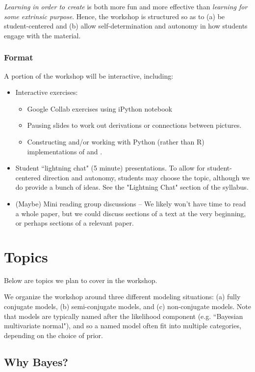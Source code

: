\documentclass{article} %
\begin{document}
\textit{Learning in order to create} is both more fun and more effective than \textit{learning for some extrinsic purpose}.   Hence,  the workshop is structured so as to (a) be student-centered and (b) allow self-determination and autonomy in how students engage with the material. 

\subsubsection{Format}

A portion of the workshop will be interactive,  including:

\begin{itemize}
\item Interactive exercises:
	\begin{itemize}
	\item Google Collab exercises using iPython notebook
	\item Pausing slides to work out derivations or connections between pictures. 
	\item Constructing and/or working with Python (rather than R) implementations of \cite{hoff2009first} and \cite{gelman2013bayesian}.
	\end{itemize}
\item Student ``lightning chat" (5 minute) presentations.   To allow for student-centered direction and autonomy,  students may choose the topic, although we do provide a bunch of ideas.  See the "Lightning Chat" section of the syllabus.	
\item (Maybe) Mini reading group discussions  -- We likely won't have time to read a whole paper,  but we could discuss sections of a text at the very beginning, or perhaps sections of a relevant paper.
\end{itemize}

\section{Topics}

Below are topics we plan to cover in the workshop.

We organize the workshop around three different modeling situations: (a) fully conjugate models, (b) semi-conjugate models, and (c) non-conjugate models. Note that models are typically named after the likelihood component (e.g. ``Bayesian multivariate normal"), and so a named model often fit into multiple categories, depending on the choice of prior.

\subsection{Why Bayes?}
\end{document}
